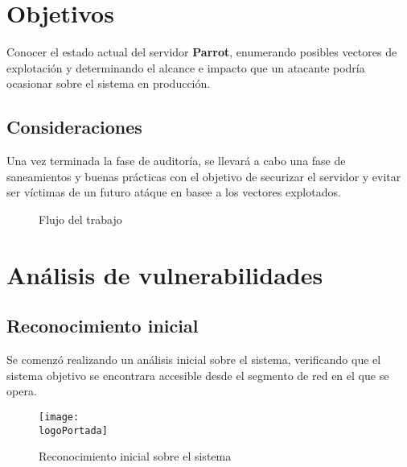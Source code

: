 \documentclass[a4paper]{article}
\newcommand{\logoPortada}{REPORTS/parrot.jpg}
\newcommand{\machineName}{Parrot}
\begin{document}
    \vspace{0.3cm}
    
    \section{Objetivos}
    Conocer el estado actual del servidor \textbf{\machineName}, enumerando posibles vectores de explotación y determinando el alcance e impacto que un atacante podría ocasionar sobre el sistema en producción.
    
    \subsection{Consideraciones}
    Una vez terminada la fase de auditoría, se llevará a cabo una fase de saneamientos y buenas prácticas con el objetivo de securizar el servidor y evitar ser víctimas de un futuro atáque en basee a los vectores explotados.
    
    \vspace{0.3cm}
    
    \begin{figure}[h]
        \begin{center}
        \end{center}
        \caption{Flujo del trabajo}
    \end{figure}
    
    \clearpage
    
    \section{Análisis de vulnerabilidades}
    
    \subsection{Reconocimiento inicial}
    Se comenzó realizando un análisis inicial sobre el sistema, verificando que el sistema objetivo se encontrara accesible desde el segmento de red en el que se opera.
    
    \begin{figure}[h]
        \centering
        \texttt{[image: \\logoPortada]}
        \caption{Reconocimiento inicial sobre el sistema}
    \end{figure}
    
\end{document}
